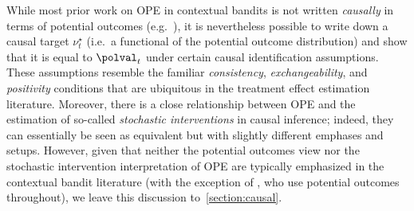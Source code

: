While most prior work on OPE in contextual bandits is not written \emph{causally} in terms of potential outcomes (e.g.~\citep{thomas2015high,karampatziakis2021off,bibaut2021post,chandak2021universal,huang2021off}), it is nevertheless possible to write down a causal target $\nu^\star_t$ (i.e.~a functional of the potential outcome distribution) and show that it is equal to $\polval_t$ under certain causal identification assumptions. These assumptions resemble the familiar \emph{consistency}, \emph{exchangeability}, and \emph{positivity} conditions that are ubiquitous in the treatment effect estimation literature. Moreover, there is a close relationship between OPE and the estimation of so-called \emph{stochastic interventions} in causal inference; indeed, they can essentially be seen as equivalent but with slightly different emphases and setups. However, given that neither the potential outcomes view nor the stochastic intervention interpretation of OPE are typically emphasized in the contextual bandit literature (with the exception of \citet{zhan2021off}, who use potential outcomes throughout), we leave this discussion to~\cref{section:causal}. 

\begin{algorithm}[!htbp]
  \caption{Protocol for the generation of contextual bandit data}
  \label{algorithm:cb}
  \begin{algorithmic}
    \;
    \STATE{}\;
    \;
    \;
    \STATE{}\;
    \;
    \;
    \STATE{}\;
    \;
    \;
    \ENDFOR{}

    \STATE{} \;
  \end{algorithmic}
\end{algorithm}

